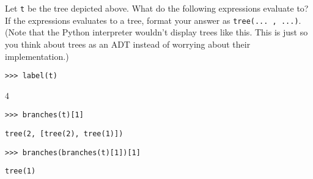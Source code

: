 \begin{blocksection}
\question Let \texttt{t} be the tree depicted above. What do the following expressions evaluate to?
If the expressions evaluates to a tree, format your answer as
\lstinline{tree(... , ...)}. 
(Note that the Python interpreter wouldn't display trees like this. This is just so you think about trees as an ADT instead of worrying about their implementation.)

\begin{lstlisting}
>>> label(t)
\end{lstlisting}
\begin{solution}[.25in]
4
\end{solution}

\begin{lstlisting}
>>> branches(t)[1]
\end{lstlisting}
\begin{solution}[.25in]
\begin{lstlisting}
tree(2, [tree(2), tree(1)])
\end{lstlisting}
\end{solution}

\begin{lstlisting}
>>> branches(branches(t)[1])[1]
\end{lstlisting}
\begin{solution}[.25in]
\begin{lstlisting}
tree(1)
\end{lstlisting}
\end{solution}
\end{blocksection}
